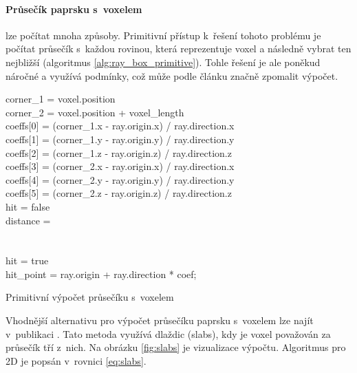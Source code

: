 \paragraph{Průsečík paprsku s~voxelem} lze počítat mnoha způsoby. Primitivní přístup k~řešení tohoto problému je počítat průsečík s~každou rovinou, která reprezentuje voxel a následně vybrat ten nejbližší (algoritmus \ref{alg:ray_box_primitive}). Tohle řešení je ale poněkud náročné a využívá podmínky, což může podle článku \cite{gpu_branch} značně zpomalit výpočet.

\begin{center}
	\begin{czechalgorithm}[H] \label{alg:ray_box_primitive}
		corner_1 = voxel.position\\
		corner_2 = voxel.position + voxel\_length\\
		coeffs[0] = (corner_1.x - ray.origin.x) / ray.direction.x\\
		coeffs[1] = (corner_1.y - ray.origin.y) / ray.direction.y\\
		coeffs[2] = (corner_1.z - ray.origin.z) / ray.direction.z\\
		coeffs[3] = (corner_2.x - ray.origin.x) / ray.direction.x\\
		coeffs[4] = (corner_2.y - ray.origin.y) / ray.direction.y\\
		coeffs[5] = (corner_2.z - ray.origin.z) / ray.direction.z\\
		hit = false\\
		distance = \inf\\
		 {\\
			 {\\
				hit = true\\
				hit\_point = ray.origin + ray.direction * coef;\\
			}
		}
		\caption{Primitivní výpočet průsečíku s~voxelem}
	\end{czechalgorithm}
\end{center}

Vhodnější alternativu pro výpočet průsečíku paprsku s~voxelem lze najít v~publikaci \cite{efficient_box_intersect}. Tato metoda využívá dlaždic (slabs), kdy je voxel považován za průsečík tří z~nich. Na obrázku \ref{fig:slabs} je vizualizace výpočtu. Algoritmus pro 2D je popsán v~rovnici \ref{eq:slabs}.



